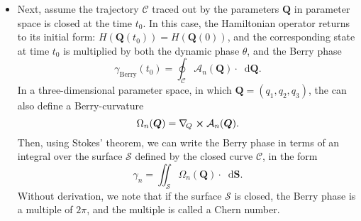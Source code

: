 \documentclass[11pt, a4paper]{article}
\newcommand{\diff}{\mathop{}\!\mathrm{d}} %
\renewcommand{\grad}{\nabla}
\newcommand{\Ham}{Hamiltonian\xspace}
\renewcommand{\vec}[1]{\bm{#1}}  %
\newcommand{\Q}{\vec{Q}}  %
\newcommand{\gq}{\grad_{\mspace{-3mu}Q}\mspace{1mu}}
\begin{document}
\begin{itemize}
    \item Next, assume the trajectory $ \mathcal{C} $ traced out by the parameters $ \Q $ in parameter space is closed at the time $ t_{0} $. In this case, the \Ham operator returns to its initial form: $ H(\Q(t_{0})) = H(\Q(0)) $, and the corresponding state at time $ t_{0} $ is multiplied by both the dynamic phase $ \theta $, and the Berry phase
    \begin{equation*}
        \gamma_{\text{Berry}}(t_{0}) = \oint_{\mathcal{C}} \mathcal{A}_{n}(\Q) \cdot \diff \Q.
    \end{equation*}
    In a three-dimensional parameter space, in which $ \Q = (q_{1}, q_{2}, q_{3}) $, the can also define a Berry-curvature
    \begin{equation*}
        \Omega_{n}(\Q) = \gq \cross \mathcal{A}_{n}(\Q).
    \end{equation*}
    Then, using Stokes' theorem, we can write the Berry phase in terms of an integral over the surface $ \mathcal{S} $ defined by the closed curve $ \mathcal{C} $, in the form
    \begin{equation*}
        \gamma_{n} = \iint_{\mathcal{S}}\Omega_{n}(\Q)\cdot \diff \vec{S}.
    \end{equation*}
    Without derivation, we note that if the surface $ \mathcal{S} $ is closed, the Berry phase is a multiple of $ 2\pi $, and the multiple is called a Chern number.
    
\end{itemize}
\end{document}

